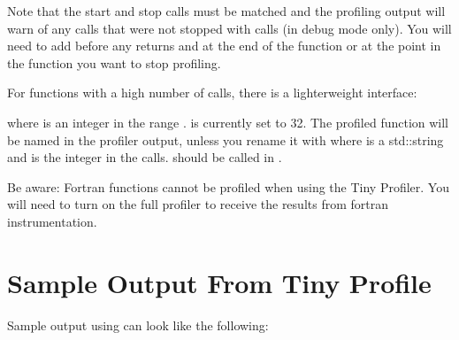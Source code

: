 \documentclass[letterpaper,10pt,english]{sphinxmanual}
\begin{document}
\sphinxAtStartPar
Note that the start and stop calls must be matched and the profiling output
will warn of any  calls that were not stopped
with  calls (in debug mode only). You will need
to add  before any returns and at the end of the
function or at the point in the function you want to stop profiling.

\sphinxAtStartPar
For functions with a high number of calls, there is a lighter\sphinxhyphen{}weight interface:

\begin{sphinxVerbatim}[commandchars=\\\{\}]
\end{sphinxVerbatim}

\sphinxAtStartPar
where  is an integer in the range \sphinxcode{\sphinxupquote{{[}1,mFortProfsIntMaxFuncs{]}}}.
 is currently set to 32.  The profiled
function will be named  in the profiler output,
unless you rename it with 
where  is a std::string and  is the integer 
in the  calls.
 should be called in .

\sphinxAtStartPar
Be aware: Fortran functions cannot be profiled when using the Tiny Profiler.
You will need to turn on the full profiler to receive the results from
fortran instrumentation.


\section{Sample Output From Tiny Profile}
\label{\detokenize{AMReX_Profiling_Tools:sample-output-from-tiny-profile}}\label{\detokenize{AMReX_Profiling_Tools:sec-sample-tiny}}
\sphinxAtStartPar
Sample output using  can look like the following:
\end{document}
